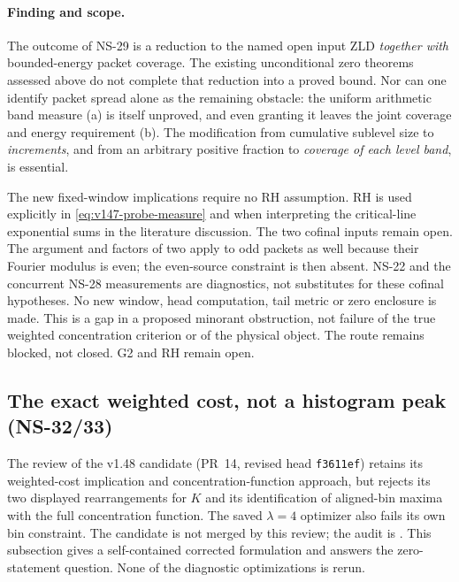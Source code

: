 \documentclass[11pt]{article}
\theoremstyle{remark}
\begin{document}
\paragraph{Finding and scope.}
The outcome of NS-29 is a reduction to the named open input ZLD
\emph{together with} bounded-energy packet coverage. The existing
unconditional zero theorems assessed above do not complete that reduction
into a proved bound. Nor can one identify packet spread alone as the
remaining obstacle: the uniform arithmetic band measure (a) is itself
unproved, and even granting it leaves the joint coverage and energy
requirement (b). The modification from cumulative sublevel size to
\emph{increments}, and from an arbitrary positive fraction to
\emph{coverage of each level band}, is essential.

The new fixed-window implications require no RH assumption. RH is used
explicitly in \eqref{eq:v147-probe-measure} and when interpreting the
critical-line exponential sums in the literature discussion. The two cofinal
inputs remain open. The argument and factors of two apply to odd
packets as well because their Fourier modulus is even; the even-source
constraint is then absent. NS-22 and the concurrent NS-28 measurements
are diagnostics, not substitutes for these cofinal hypotheses. No new
window, head computation, tail metric or zero enclosure is made. This
is a gap in a proposed minorant obstruction, not failure of the true
weighted concentration criterion or of the physical object. The route
remains blocked, not closed. G2 and RH remain open.

\subsection*{The exact weighted cost, not a histogram peak (NS-32/33)}

The review of the v1.48 candidate (PR~14, revised head \texttt{f3611ef})
retains its weighted-cost implication and concentration-function approach,
but rejects its two displayed rearrangements for $K$ and its identification
of aligned-bin maxima with the full concentration function. The saved
$\lambda=4$ optimizer also fails its own bin constraint. The candidate
is not merged by this review; the audit is
.
This subsection gives a self-contained corrected formulation and answers
the zero-statement question. None of the diagnostic optimizations is rerun.
\end{document}
